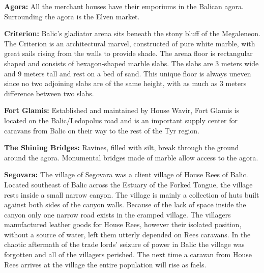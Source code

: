 {
	\textbf{Agora:} All the merchant houses have their emporiums in the Balican agora. Surrounding the agora is the Elven market.

	\textbf{Criterion:} Balic's gladiator arena sits beneath the stony bluff of the Megaleneon. The Criterion is an architectural marvel, constructed of pure white marble, with great sails rising from the walls to provide shade. The arena floor is rectangular shaped and consists of hexagon-shaped marble slabs. The slabs are 3 meters wide and 9 meters tall and rest on a bed of sand. This unique floor is always uneven since no two adjoining slabs are of the same height, with as much as 3 meters difference between two slabs.

	\textbf{Fort Glamis:} Established and maintained by House Wavir, Fort Glamis is located on the Balic/Ledopolus road and is an important supply center for caravans from Balic on their way to the rest of the Tyr region.

	\textbf{The Shining Bridges:} Ravines, filled with silt, break through the ground around the agora. Monumental bridges made of marble allow access to the agora.

	\textbf{Segovara:} The village of Segovara was a client village of House Rees of Balic. Located southeast of Balic across the Estuary of the Forked Tongue, the village rests inside a small narrow canyon. The village is mainly a collection of huts built against both sides of the canyon walls. Because of the lack of space inside the canyon only one narrow road exists in the cramped village. The villagers manufactured leather goods for House Rees, however their isolated position, without a source of water, left them utterly depended on Rees caravans. In the chaotic aftermath of the trade lords' seizure of power in Balic the village was forgotten and all of the villagers perished. The next time a caravan from House Rees arrives at the village the entire population will rise as faels.
}
